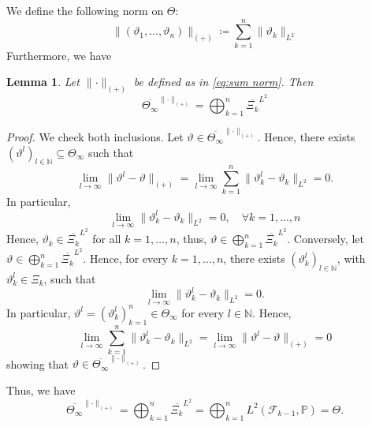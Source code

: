 \documentclass[11pt,a4paper,twoside,openany]{report}
\numberwithin{equation}{section}
\theoremstyle{plain} %
\newtheorem{lemma}[theorem]{Lemma}
\theoremstyle{definition} %
\theoremstyle{remark} %
\begin{document}
    
We define the following norm on \(\Theta\):
\begin{equation}\label{eq:sum norm}
    \lVert(\vartheta_1,\dots,\vartheta_{n})\rVert_{(+)}\coloneqq\sum_{k=1}^{n}\lVert \vartheta_k\rVert_{L^2}
\end{equation}
Furthermore, we have 
\begin{lemma}
    Let \(\lVert\cdot\rVert_{(+)}\) be defined as in \eqref{eq:sum norm}. Then 
    \begin{equation*}
        \overline{\Theta_{\infty}}^{\lVert\cdot\rVert_{(+)}}=\bigoplus_{k=1}^{n}\overline{\Xi_k}^{L^2}
    \end{equation*}
\end{lemma}
\begin{proof}
    We check both inclusions. Let \(\vartheta\in\overline{\Theta_{\infty}}^{\lVert\cdot\rVert_{(+)}}\). Hence, there exists \((\vartheta^l)_{l\in\mathbb{N}}\subseteq\Theta_{\infty}\) such that 
    \begin{equation*}
        \lim_{l\to\infty}\lVert \vartheta^l-\vartheta\rVert_{(+)}=\lim_{l\to\infty}\sum_{k=1}^n\lVert\vartheta^l_k-\vartheta_k\rVert_{L^2}=0.
    \end{equation*}
    In particular, 
    \begin{equation*}
        \lim_{l\to\infty}\lVert\vartheta^l_k-\vartheta_k\rVert_{L^2}=0,\quad\forall k=1,\dots,n
    \end{equation*}
    Hence, \(\vartheta_k\in\overline{\Xi_k}^{L^2}\) for all \(k=1,\dots,n\), thus, \(\vartheta\in\bigoplus_{k=1}^{n}\overline{\Xi_k}^{L^2}\). Conversely, let \(\vartheta\in\bigoplus_{k=1}^{n}\overline{\Xi_k}^{L^2}\). Hence, for every \(k=1,\dots,n\), there exists \((\vartheta^l_k)_{l\in\mathbb{N}}\), with \(\vartheta^l_k\in\Xi_k\), such that 
    \begin{equation*}
    \lim_{l\to\infty}\lVert \vartheta^l_k-\vartheta_k\rVert_{L^2}=0.
    \end{equation*}
    In particular, \(\vartheta^l=(\vartheta^l_k)_{k=1}^n\in\Theta_{\infty}\) for every \(l\in\mathbb{N}\).
 Hence,
    \begin{equation*}
        \lim_{l\to\infty}\sum_{k=1}^n\lVert\vartheta^l_k-\vartheta_k\rVert_{L^2}=\lim_{l\to\infty}\lVert\vartheta^l-\vartheta\rVert_{(+)}=0
    \end{equation*}
    showing that \(\vartheta\in\overline{\Theta_{\infty}}^{\lVert\cdot\rVert_{(+)}}\).
\end{proof}
Thus, we have
\begin{equation*}
    \overline{\Theta_{\infty}}^{\lVert\cdot\rVert_{(+)}}=\bigoplus_{k=1}^{n}\overline{\Xi_k}^{L^2}=\bigoplus_{k=1}^{n}L^2(\mathcal{F}_{k-1},\mathbb{P})=\Theta.
\end{equation*}
\end{document}
